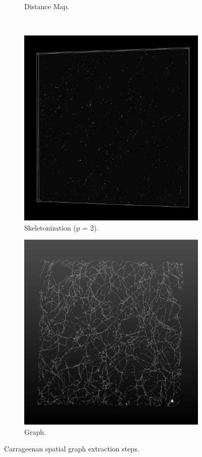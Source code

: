 \begin{figure}[H]
\begin{subfigure}{0.5\textwidth}
    \caption{Distance Map.}
    \label{subfig:carra_dmap}
  \end{subfigure}\\[1ex]
  \begin{subfigure}{0.5\textwidth}
    \centering
    \includegraphics[width=0.9\linewidth]{Figures/chapter-image/pipeline_screenshots/carra_skeleton_tile1.png}
    \caption{Skeletonization (p = 2).}
    \label{subfig:carra_skeleton}
  \end{subfigure}%
  \begin{subfigure}{0.5\textwidth}
    \centering
    \includegraphics[width=0.9\linewidth]{Figures/chapter-image/pipeline_screenshots/carra_graph_tile1.png}
    \caption{Graph.}
    \label{fig:carra_graph}
  \end{subfigure}%
  \caption{Carrageenan spatial graph extraction steps.}
  \label{fig:carra_all}
\end{figure}

